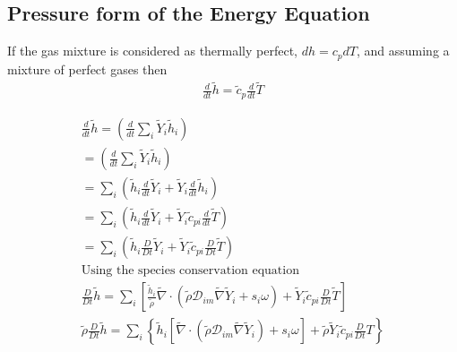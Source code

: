 \documentclass[preprint,12pt,authoryear]{elsarticle}
\begin{document}
\subsection{Pressure form  of the Energy Equation}

%
If the gas mixture is considered as thermally perfect, 
$dh=c_{p}dT$, and assuming a mixture of perfect gases then 
\begin{equation}
\begin{split}
        \frac{d}{dt}\tilde{h}=\tilde{c}_p\frac{d}{dt}\tilde{T}
\end{split}
\end{equation}


\begin{equation}
\begin{split}
        \frac{d}{dt}\tilde{h}
        =
        \left(
                \frac{d}{dt}
		\sum\limits_i\tilde{Y}_i\tilde{h}_i
        \right)
\\
        =
        \left(
                \frac{d}{dt}
		\sum\limits_i\tilde{Y}_i
		\tilde{h}_i
        \right)
\\
        =
        \sum\limits_i
        \left(
                \tilde{h}_i
                \frac{d}{dt}
		\tilde{Y}_i
                +
                \tilde{Y}_i
                \frac{d}{dt}
		\tilde{h}_i
        \right)
\\
        =
        \sum\limits_i
        \left(
                \tilde{h}_i
                \frac{d}{dt}
		\tilde{Y}_i
                +
                \tilde{Y}_i
                \tilde{c}_{pi}
                \frac{d}{dt}
		\tilde{T}
        \right)
\\
        =
        \sum\limits_i
        \left(
                \tilde{h}_i
                \frac{D}{Dt}
		\tilde{Y}_i
                +
                \tilde{Y}_i
                \tilde{c}_{pi}
                \frac{D}{Dt}
		\tilde{T}
        \right)
\\
\text{Using the species conservation equation}
\\
        \frac{D}{Dt}
	\tilde{h}
        =
        \sum\limits_i
        \left[
                \frac{\tilde{h}_i}{\tilde{\rho}}
                \tilde{\nabla}\cdot
                (
		\tilde{\rho}\mathcal{D}_{im}\tilde{\nabla}\tilde{Y}_i
		+
        	s_i \omega
		)
                +
                \tilde{Y}_i
                \tilde{c}_{pi}
        	\frac{D}{Dt}
		\tilde{T}
        \right]
\\
        \tilde{\rho}
        \frac{D}{Dt}
	\tilde{h}
        =
        \sum\limits_i
        \left\{
                \tilde{h}_i
                [
                	\tilde{\nabla}\cdot
			   (
			\tilde{\rho}\mathcal{D}_{im}\tilde{\nabla}\tilde{Y}_i
			)
			+
        		s_i \omega
		    ]
                +
                \tilde{\rho}
                \tilde{Y}_i
                \tilde{c}_{pi}
        	\frac{D}{Dt}T
        \right\}
\end{split}
\end{equation}
\end{document}

